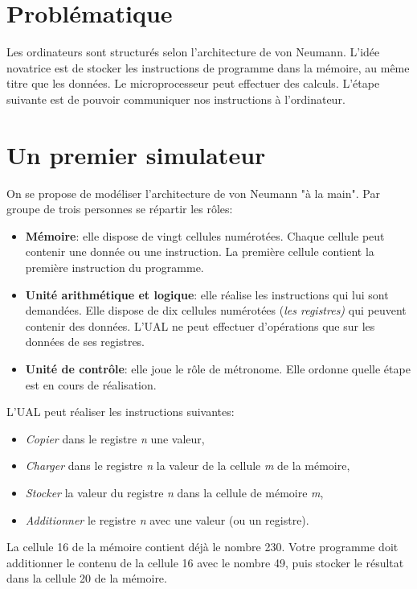 \documentclass[a4paper,11pt]{article}
\begin{document}
\begin{Form}
\section{Problématique}
Les ordinateurs sont structurés selon l'architecture de von Neumann. L'idée novatrice est de stocker les instructions de programme dans la mémoire, au même titre que les données. Le microprocesseur peut effectuer des calculs. L'étape suivante est de pouvoir communiquer nos instructions à l'ordinateur.
\begin{center}
\end{center}
\section{Un premier simulateur}
\label{simulmanuel}
On se propose de modéliser l'architecture de von Neumann "à la main". Par groupe de trois personnes se répartir les rôles:
\begin{itemize}
\item \textbf{Mémoire}: elle dispose de vingt cellules numérotées. Chaque cellule peut contenir une donnée ou une instruction. La première cellule contient la première instruction du programme.
\item \textbf{Unité arithmétique et logique}: elle réalise les instructions qui lui sont demandées. Elle dispose de dix cellules numérotées (\emph{les registres)} qui peuvent contenir des données. L'UAL ne peut effectuer d'opérations que sur les données de ses registres.
\item \textbf{Unité de contrôle}: elle  joue le rôle de métronome. Elle ordonne quelle étape est en cours de réalisation.
\end{itemize}
\medskip
L'UAL peut réaliser les instructions suivantes:
\begin{itemize}
\item \emph{Copier} dans le registre \emph{n} une valeur, 
\item \emph{Charger} dans le registre \emph{n} la valeur de la cellule \emph{m} de la mémoire,
\item \emph{Stocker} la valeur du registre \emph{n} dans la cellule de mémoire \emph{m},
\item \emph{Additionner} le registre \emph{n} avec une valeur (ou un registre).
\end{itemize}
\begin{activite}
La cellule 16 de la mémoire contient déjà le nombre 230. Votre programme doit additionner le contenu de la cellule 16 avec le nombre 49, puis stocker le résultat dans la cellule 20 de la mémoire.
\end{activite}

\end{Form}
\end{document}
